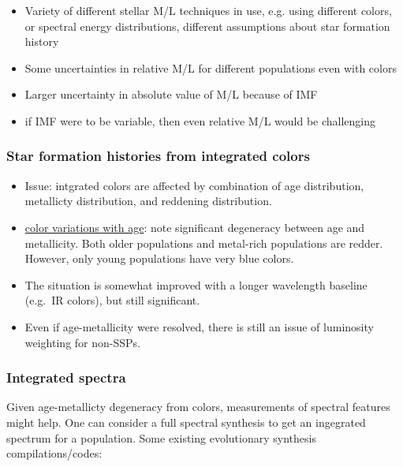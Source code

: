 \documentclass{article}
\begin{document}
\begin{itemize}
\begin{itemize}
            \item Variety of different stellar M/L techniques in use, e.g.
                using different colors, or spectral energy distributions,
                different assumptions about star formation history
            \item Some uncertainties in relative M/L for different populations
                even with colors
            \item Larger uncertainty in absolute value of M/L because of IMF
            \item if IMF were to be variable, then even relative M/L would be
                challenging
        \end{itemize}
\end{itemize}

\subsubsection{Star formation histories from integrated colors}
\begin{itemize}
    \item Issue: intgrated colors are affected by combination of age
        distribution,
        metallicty distribution, and reddening distribution.
    \item \href{http://astronomy.nmsu.edu/holtz/a555/resources/int.gif}
        {color variations with age}: note significant degeneracy between age
        and metallicity. Both older populations and metal-rich populations
        are redder. However, only young populations have very blue colors.
    \item The situation is somewhat improved with a longer wavelength
        baseline (e.g.\ IR colors), but still significant.
    \item Even if age-metallicity were resolved, there is still an issue
        of luminosity weighting for non-SSPs.
\end{itemize}

\subsubsection{Integrated spectra}
Given age-metallicty degeneracy from colors, measurements of spectral features
might help. One can consider a full spectral synthesis to get an ingegrated
spectrum for a population. Some existing evolutionary synthesis
compilations/codes:
\end{document}
